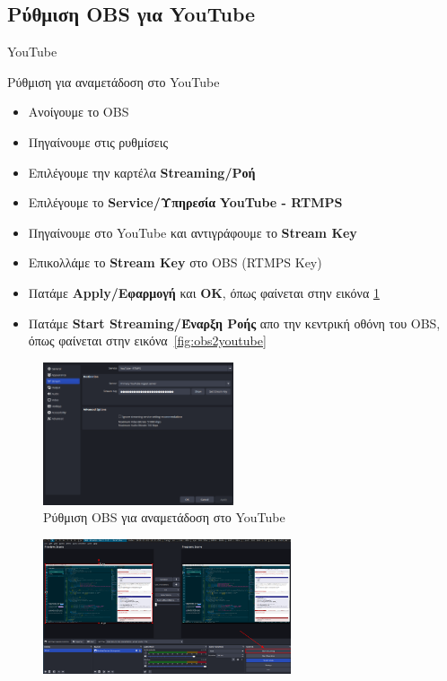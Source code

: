 \documentclass[aspectratio=169]{beamer}
\begin{document}
\subsection{Ρύθμιση OBS για YouTube}
\begin{frame}[allowframebreaks]{YouTube}
  \begin{block}{Ρύθμιση για αναμετάδοση στο YouTube}
    \begin{itemize}
      \item Ανοίγουμε το OBS
      \item Πηγαίνουμε στις ρυθμίσεις
      \item Επιλέγουμε την καρτέλα \textbf{Streaming/Ροή}
      \item Επιλέγουμε το \textbf{Service/Υπηρεσία} \textbf{YouTube - RTMPS}
      \item Πηγαίνουμε στο YouTube και αντιγράφουμε το \textbf{Stream Key}
      \item Επικολλάμε το \textbf{Stream Key} στο OBS (RTMPS Key)
      \item Πατάμε \textbf{Apply/Εφαρμογή} και \textbf{OK}, όπως φαίνεται στην εικόνα \ref{fig:settings}
      \item Πατάμε \textbf{Start Streaming/Έναρξη Ροής} απο την κεντρική οθόνη του OBS, όπως φαίνεται στην εικόνα~\ref{fig:obs2youtube}
    \end{itemize}
  \end{block}
  \begin{figure}
    \includegraphics[width=0.5\textwidth]{images/settings.png}
    \caption{Ρύθμιση OBS για αναμετάδοση στο YouTube}
    \label{fig:settings}
  \end{figure}
  \begin{figure}
    \includegraphics[width=0.65\textwidth]{images/obs2youtube.png}

\end{figure}
\end{frame}
\end{document}

